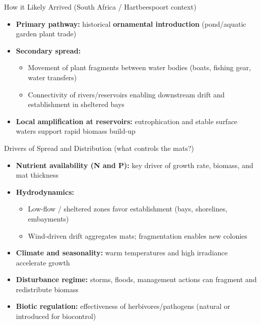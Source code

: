 \begin{frame}{How it Likely Arrived (South Africa / Hartbeespoort context)}
\begin{itemize}
  \item \textbf{Primary pathway:} historical \textbf{ornamental introduction} (pond/aquatic garden plant trade)
  \item \textbf{Secondary spread:}
    \begin{itemize}
      \item Movement of plant fragments between water bodies (boats, fishing gear, water transfers)
      \item Connectivity of rivers/reservoirs enabling downstream drift and establishment in sheltered bays
    \end{itemize}
  \item \textbf{Local amplification at reservoirs:} eutrophication and stable surface waters support rapid biomass build-up
\end{itemize}
\end{frame}

\begin{frame}{Drivers of Spread and Distribution (what controls the mats?)}
\begin{itemize}
  \item \textbf{Nutrient availability (N and P):} key driver of growth rate, biomass, and mat thickness
  \item \textbf{Hydrodynamics:}
    \begin{itemize}
      \item Low-flow / sheltered zones favor establishment (bays, shorelines, embayments)
      \item Wind-driven drift aggregates mats; fragmentation enables new colonies
    \end{itemize}
  \item \textbf{Climate and seasonality:} warm temperatures and high irradiance accelerate growth
  \item \textbf{Disturbance regime:} storms, floods, management actions can fragment and redistribute biomass
  \item \textbf{Biotic regulation:} effectiveness of herbivores/pathogens (natural or introduced for biocontrol)
\end{itemize}
\end{frame}


